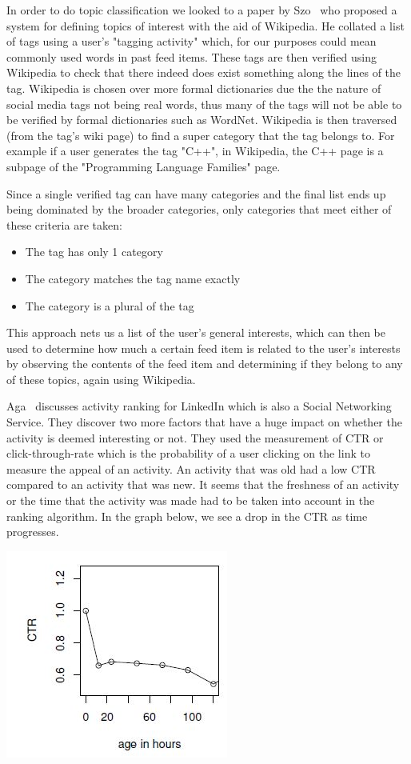 In order to do topic classification we looked to a paper by Szo~\cite{szomszor2008semantic} who proposed a system for defining topics of interest with the aid of Wikipedia. He collated a list of tags using a user's "tagging activity" which, for our purposes could mean commonly used words in past feed items. These tags are then verified using Wikipedia to check that there indeed does exist something along the lines of the tag. Wikipedia is chosen over more formal dictionaries due the the nature of social media tags not being real words, thus many of the tags will not be able to be verified by formal dictionaries such as WordNet. Wikipedia is then traversed (from the tag's wiki page) to find a super category that the tag belongs to. For example if a user generates the tag "C++", in Wikipedia, the C++ page is a subpage of the "Programming Language Families" page.

Since a single verified tag can have many categories and the final list ends up being dominated by the broader categories, only categories that meet either of these criteria are taken:
\begin{itemize}
\item The tag has only 1 category
\item The category matches the tag name exactly
\item The category is a plural of the tag
\end{itemize}

This approach nets us a list of the user's general interests, which can then be used to determine how much a certain feed item is related to the user's interests by observing the contents of the feed item and determining if they belong to any of these topics, again using Wikipedia.

Aga~\cite{Aga2014} discusses activity ranking for LinkedIn which is also a Social Networking Service. They discover two more factors that have a huge impact on whether the activity is deemed interesting or not. They used the measurement of CTR or click-through-rate which is the probability of a user clicking on the link to measure the appeal of an activity. An activity that was old had a low CTR compared to an activity that was new. It seems that the freshness of an activity or the time that the activity was made had to be taken into account in the ranking algorithm. In the graph below, we see a drop in the CTR as time progresses.

\begin{center}
\includegraphics[scale=0.8]{images/freshness.jpg}
\end{center}

